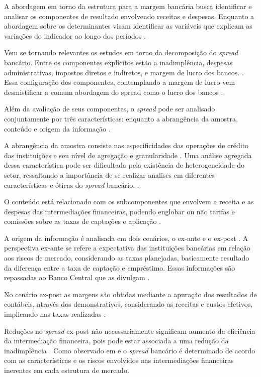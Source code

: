 \documentclass[12pt,openright,oneside,a4paper,chapter=TITLE,section=TITLE,subsection=Title,english,french,spanish,portugues,sumario=tradicional]{04-class-files/abntex2}
\begin{document}
A abordagem em torno da estrutura para a margem bancária busca identificar e analisar os componentes de resultado envolvendo receitas e despesas. Enquanto a abordagem sobre os determinantes visam identificar as variáveis que explicam as variações do indicador ao longo dos períodos \cite{leal:2006}.

Vem se tornando relevantes os estudos em torno da decomposição do \emph{spread} bancário. Entre os componentes explícitos estão a inadimplência, despesas administrativas, impostos diretos e indiretos, e margem de lucro dos bancos. \cite{BCB:2000}. Essa configuração dos componentes, contemplando a margem de lucro vem desmistificar a comum abordagem do spread como o lucro dos bancos \cite{costa;nakane:2004}.

Além da avaliação de seus componentes, o \emph{spread} pode ser analisado conjuntamente por três características: enquanto a abrangência da amostra, conteúdo e origem da informação \cite{leal:2006}.

A abrangência da amostra consiste nas especificidades das operações de crédito das instituições e seu nível de agregação e granularidade \cite{costa;nakane:2004}. Uma análise agregada dessa característica pode ser dificultada pela existência de heterogeneidade do setor, ressaltando a importância de se realizar analises em diferentes características e óticas do \emph{spread} bancário. \cite{block:2000}.

O conteúdo está relacionado com os subcomponentes que envolvem a receita e as despesas das intermediações financeiras, podendo englobar ou não tarifas e comissões sobre as taxas de captações e aplicação \cite{block:2000}.

A origem da informação é analisada em dois cenários, o ex-ante e o ex-post \cite{kunt:1999}. A perspectiva ex-ante se refere a expectativa das instituições bancárias em relação aos riscos de mercado, considerando as taxas planejadas, basicamente resultado da diferença entre a taxa de captação e empréstimo. Essas informações são repassadas ao Banco Central que as divulgam \cite{durigan:2018}.

No cenário ex-post as margens são obtidas mediante a apuração dos resultados de contábeis, através dos demonstrativos, considerando as receitas e custos efetivos, implicando nas taxas realizadas \cite{kunt:1999, durigan:2018}.

Reduções no \emph{spread} ex-post não necessariamente significam aumento da eficiência da intermediação financeira, pois pode estar associada a uma redução da inadimplência \cite{kunt:1999}. Como observado em \textcite{klein:1971} e \textcite{ho-saunders:1981} o \emph{spread} bancário é determinado de acordo com as características e os riscos envolvidos nas intermediações financeiras inerentes em cada estrutura de mercado.
\end{document}
